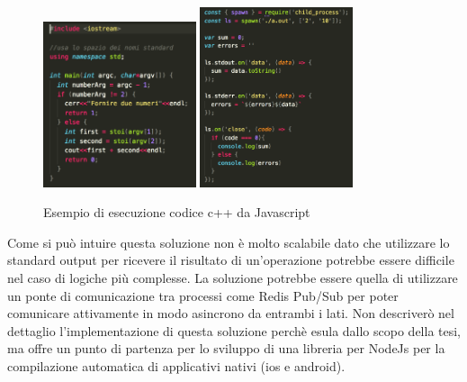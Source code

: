 \begin{figure}[h]
\centering
\includegraphics[width=0.4\textwidth]{images/cppCode.png}
\includegraphics[width=0.4\textwidth]{images/jsCode.png}
\caption{Esempio di esecuzione codice c++ da Javascript}
\end{figure}

\vspace{5mm}Come si può intuire questa soluzione non è molto scalabile dato che utilizzare lo standard output per ricevere il risultato di un'operazione potrebbe essere difficile nel caso di logiche più complesse. La soluzione potrebbe essere quella di utilizzare un ponte di comunicazione tra processi come Redis Pub/Sub \cite{PubSubRedis} per poter comunicare attivamente in modo asincrono da entrambi i lati. Non descriverò nel dettaglio l'implementazione di questa soluzione perchè esula dallo scopo della tesi, ma offre un punto di partenza per lo sviluppo di una libreria per NodeJs per la compilazione automatica di applicativi nativi (ios e android).









